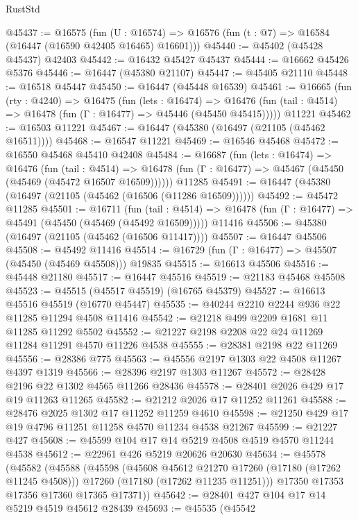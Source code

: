 \begin{lexlean}{RustStd}
\begin{coremodule}
@45437 := @16575
    (fun (U : @16574) => @16576 (fun (t : @7) => @16584 (@16447 (@16590 @42405 @16465) @16601)))
@45440 := @45402 (@45428 @45437) @42403
@45442 := @16432 @45427 @45437
@45444 := @16662 @45426 @5376
@45446 := @16447 (@45380 @21107)
@45447 := @45405 @21110
@45448 := @16518 @45447
@45450 := @16447 (@45448 @16539)
@45461 := @16665
    (fun (rty : @4240) =>
    @16475
      (fun (lets : @16474) =>
      @16476 (fun (tail : @4514) => @16478 (fun (Γ : @16477) => @45446 (@45450 @45415)))))
    @11221
@45462 := @16503 @11221
@45467 := @16447 (@45380 (@16497 (@21105 (@45462 @16511))))
@45468 := @16547 @11221
@45469 := @16546 @45468
@45472 := @16550 @45468 @45410 @42408
@45484 := @16687
    (fun (lets : @16474) =>
    @16476
      (fun (tail : @4514) =>
      @16478 (fun (Γ : @16477) => @45467 (@45450 (@45469 (@45472 @16507 @16509))))))
    @11285
@45491 := @16447 (@45380 (@16497 (@21105 (@45462 (@16506 (@11286 @16509))))))
@45492 := @45472 @11285
@45501 := @16711
    (fun (tail : @4514) => @16478 (fun (Γ : @16477) => @45491 (@45450 (@45469 (@45492 @16509)))))
    @11416
@45506 := @45380 (@16497 (@21105 (@45462 (@16506 @11417))))
@45507 := @16447 @45506
@45508 := @45492 @11416
@45514 := @16729 (fun (Γ : @16477) => @45507 (@45450 (@45469 @45508))) @19835
@45515 := @16613 @45506
@45516 := @45448 @21180
@45517 := @16447 @45516
@45519 := @21183 @45468 @45508
@45523 := @45515 (@45517 @45519) (@16765 @45379)
@45527 := @16613 @45516 @45519 (@16770 @45447)
@45535 := @40244 @2210 @2244 @936 @22 @11285 @11294 @4508 @11416
@45542 := @21218 @499 @2209 @1681 @11 @11285 @11292 @5502
@45552 := @21227 @2198 @2208 @22 @24 @11269 @11284 @11291 @4570 @11226 @4538
@45555 := @28381 @2198 @22 @11269
@45556 := @28386 @775
@45563 := @45556 @2197 @1303 @22 @4508 @11267 @4397 @1319
@45566 := @28396 @2197 @1303 @11267
@45572 := @28428 @2196 @22 @1302 @4565 @11266 @28436
@45578 := @28401 @2026 @429 @17 @19 @11263 @11265
@45582 := @21212 @2026 @17 @11252 @11261
@45588 := @28476 @2025 @1302 @17 @11252 @11259 @4610
@45598 := @21250 @429 @17 @19 @4796 @11251 @11258 @4570 @11234 @4538 @21267
@45599 := @21227 @427
@45608 := @45599 @104 @17 @14 @5219 @4508 @4519 @4570 @11244 @4538
@45612 := @22961 @426 @5219 @20626 @20630
@45634 := @45578
    (@45582
      (@45588
        (@45598
          (@45608 @45612 @21270 @17260 (@17180 (@17262 @11245 @4508)))
          @17260
          (@17180 (@17262 @11235 @11251)))
        @17350
        @17353
        @17356
        @17360
        @17365
        @17371))
@45642 := @28401 @427 @104 @17 @14 @5219 @4519 @45612 @28439
@45693 := @45535
    (@45542

\end{coremodule}
\end{lexlean}
